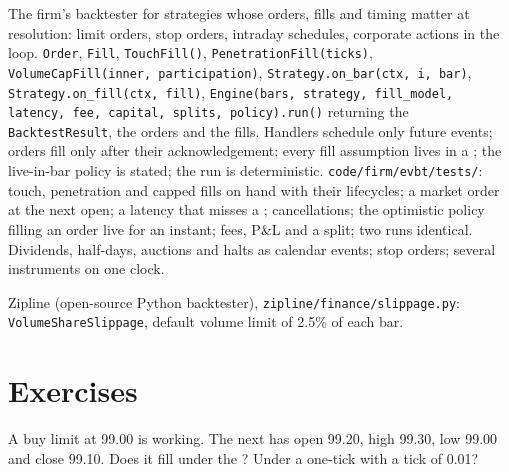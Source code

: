 \begin{build}
 The firm's backtester for strategies whose orders, fills and timing matter at  resolution: limit orders, stop orders, intraday
schedules, corporate actions in the loop.
 \texttt{Order}, \texttt{Fill}, \texttt{TouchFill()}, \texttt{PenetrationFill(ticks)}, \texttt{VolumeCapFill(inner, participation)},
\texttt{Strategy.on\_bar(ctx, i, bar)}, \texttt{Strategy.on\_fill(ctx, fill)}, \texttt{Engine(bars, strategy, fill\_model, latency, fee, capital, splits,
policy).run()} returning the \texttt{BacktestResult}, the orders and the fills.
 Handlers schedule only future events; orders fill only after their acknowledgement; every fill assumption lives in a ; the
live-in-bar policy is stated; the run is deterministic.
 \texttt{code/firm/evbt/tests/}: touch, penetration and capped fills on hand  with their lifecycles; a market order at the next
open; a latency that misses a ; cancellations; the optimistic policy filling an order live for an instant; fees, P\&L and a split; two runs identical.
 Dividends, half-days, auctions and halts as calendar events; stop orders; several instruments on one clock.
\end{build}

\begin{omsources}
\item Zipline (open-source Python backtester), \texttt{zipline/finance/slippage.py}: \texttt{VolumeShareSlippage}, default volume limit of 2.5\% of each bar.
\end{omsources}

\section{Exercises}

\begin{exercise}[$\star$]\label{exo:rs:event-driven-backtests:1}
A buy limit at 99.00 is working. The next  has open 99.20, high 99.30, low 99.00 and close 99.10. Does it fill under the ? Under a one-tick
 with a tick of 0.01?
\end{exercise}

